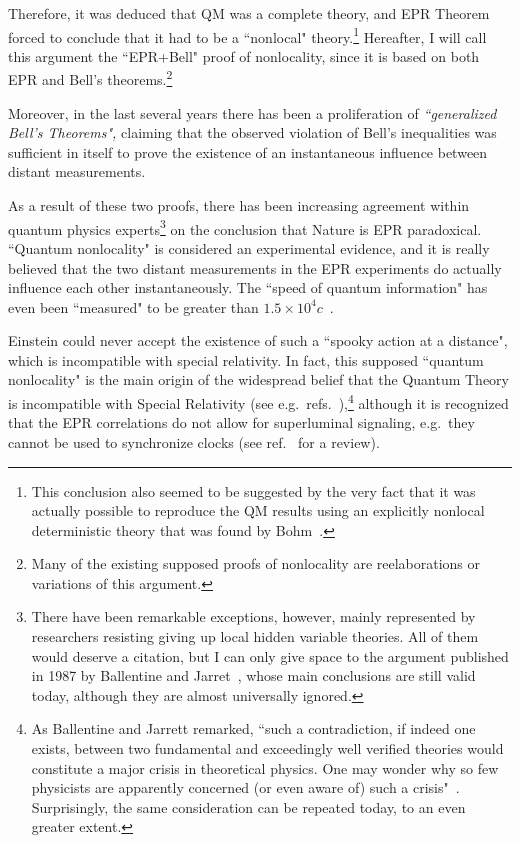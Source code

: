 \documentclass[12pt]{article}
\begin{document}
Therefore, it was deduced that QM was a complete theory, and EPR
Theorem forced to conclude that it had to be a ``nonlocal"
theory.\footnote{This conclusion also seemed to be suggested by the
very fact that it was actually possible to reproduce the QM results
using an explicitly nonlocal deterministic theory that was found by
Bohm~\cite{Bohm52}.} Hereafter, I will call this argument the
``EPR+Bell" proof of nonlocality, since it is based on both EPR and
Bell's theorems.\footnote{Many of the existing supposed proofs of
nonlocality are reelaborations or variations of this argument.}

Moreover, in the last several years there has been a proliferation
of \emph{``generalized Bell's Theorems",} claiming that the
observed violation of  Bell's inequalities was sufficient in
itself to prove the existence of an instantaneous influence
between distant measurements.

As a result of these two proofs, there has been increasing agreement
within quantum physics experts\footnote{There have been remarkable
exceptions, however, mainly represented by researchers resisting
giving up local hidden variable theories. All of them would deserve a
citation, but I can only give space to the argument published in 1987
by Ballentine and Jarret~\cite{BaJa87}, whose main conclusions are
still valid today, although they are almost universally ignored.} on
the conclusion that Nature is EPR paradoxical. ``Quantum nonlocality"
is considered an experimental evidence, and it is really believed that
the two distant measurements in the EPR experiments do actually
influence each other instantaneously. The ``speed of quantum
information" has even been ``measured" to be greater than
$1.5\times10^{4}c$~\cite{Scarani}.

Einstein could never accept the existence of such a ``spooky action at
a distance", which is incompatible with special relativity. In fact,
this supposed ``quantum nonlocality" is the main origin of the
widespread belief that the Quantum Theory is incompatible with Special
Relativity (see e.g.\ refs.~\cite{measrel,Scarani}),\footnote{As
Ballentine and Jarrett remarked, ``such a contradiction, if indeed one
exists, between two fundamental and exceedingly well verified theories
would constitute a major crisis in theoretical physics. One may wonder
why so few physicists are apparently concerned (or even aware of) such
a crisis"~\cite{BaJa87}. Surprisingly, the same consideration can be
repeated today, to an even greater extent.} although it is recognized
that the EPR correlations do not allow for superluminal signaling,
e.g.\ they cannot be used to synchronize clocks (see ref.~\cite{Laloe}
for a review).
\end{document}
